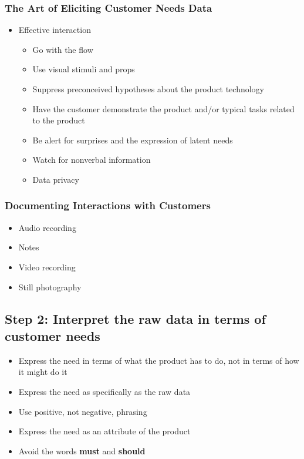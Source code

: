 \documentclass[a4paper,12pt,openany]{book}
\begin{document}
\subsubsection{The Art of Eliciting Customer Needs Data}
\begin{itemize}
    \item Effective interaction
    \begin{itemize}
        \item Go with the flow
        \item Use visual stimuli and props
        \item Suppress preconceived hypotheses about the product technology
        \item Have the customer demonstrate the product and/or typical tasks related to the product
        \item Be alert for surprises and the expression of latent needs
        \item Watch for nonverbal information
        \item Data privacy
    \end{itemize}
\end{itemize}
\subsubsection{Documenting Interactions with Customers}
\begin{itemize}
    \item Audio recording
    \item Notes
    \item Video recording
    \item Still photography
\end{itemize}

\subsection{Step 2: Interpret the raw data in terms of customer needs}
\begin{itemize}
    \item Express the need in terms of what the product has to do, not in terms of how it might do it
    \item Express the need as specifically as the raw data
    \item Use positive, not negative, phrasing
    \item Express the need as an attribute of the product
    \item Avoid the words \textbf{must} and \textbf{should}
\end{itemize}
\end{document}
